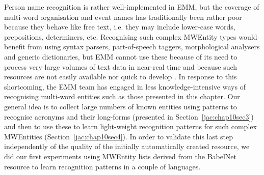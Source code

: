 \documentclass[output=paper]{langsci/langscibook}
\begin{document}
 
%
% 
%

Person name recognition is rather well-implemented in EMM, but the coverage of multi-word organisation and event names has traditionally been rather poor because they behave like free text, i.e. they may include lower-case words, prepositions, determiners, etc. Recognising such complex MWEntity types would benefit from using syntax parsers, part-of-speech taggers, morphological analysers and generic dictionaries, but EMM cannot use these because of its need to process very large volumes of text data in near-real time and because such resources are not easily available nor quick to develop \citep{steinberger-13}. In response to this shortcoming, the EMM team has engaged in less knowledge-intensive ways of recognising multi-word entities such as those presented in this chapter. Our general idea is to collect large numbers of known entities using patterns to recognise acronyms and their long-forms (presented in Section~\ref{jac:chap10sec3}) and then to use these to learn light-weight recognition patterns for such complex MWEntities (Section~\ref{jac:chap10sec4}). In order to validate this last step independently of the quality of the initially automatically created resource, we did our first experiments using MWEntity lists derived from the BabelNet resource to learn recognition patterns in a couple of languages. %
\end{document}
